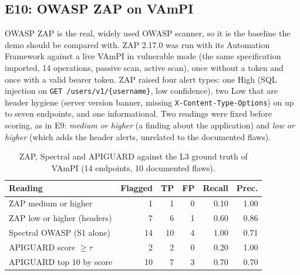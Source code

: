 \documentclass[conference]{IEEEtran}
\begin{document}
\subsection{E10: OWASP ZAP on VAmPI}
\label{sec:e10}
OWASP ZAP is the real, widely used OWASP scanner, so it is the baseline the demo should be compared with. ZAP 2.17.0 was run with its Automation Framework against a live VAmPI
in vulnerable mode (the same specification imported, 14 operations, passive scan, active scan), once without a token and once with a valid bearer token.
ZAP raised four alert types: one High (SQL injection on \texttt{GET /users/v1/\{username\}}, low confidence),
two Low that are header hygiene (server version banner, missing \texttt{X-Content-Type-Options}) on up to seven endpoints, and one informational. Two readings were fixed before scoring, as in E9:
\emph{medium or higher} (a finding about the application) and \emph{low or higher} (which adds the header alerts, unrelated to the documented flaws).

\begin{table}[!t]
\caption{ZAP, Spectral and APIGUARD against the L3 ground truth of VAmPI (14 endpoints, 10 documented flaws).}
\label{tab:e10}
\centering
\footnotesize
\begin{tabular}{lrrrrr}
\toprule
\textbf{Reading} & \textbf{Flagged} & \textbf{TP} & \textbf{FP} & \textbf{Recall} & \textbf{Prec.}\\
\midrule
ZAP medium or higher & 1 & 1 & 0 & 0.10 & 1.00\\
ZAP low or higher (headers) & 7 & 6 & 1 & 0.60 & 0.86\\
Spectral OWASP (S1 alone) & 14 & 10 & 4 & 1.00 & 0.71\\
APIGUARD score $\geq\tau$ & 2 & 2 & 0 & 0.20 & 1.00\\
APIGUARD top 10 by score & 10 & 7 & 3 & 0.70 & 0.70\\
\bottomrule
\end{tabular}
\end{table}
\end{document}
